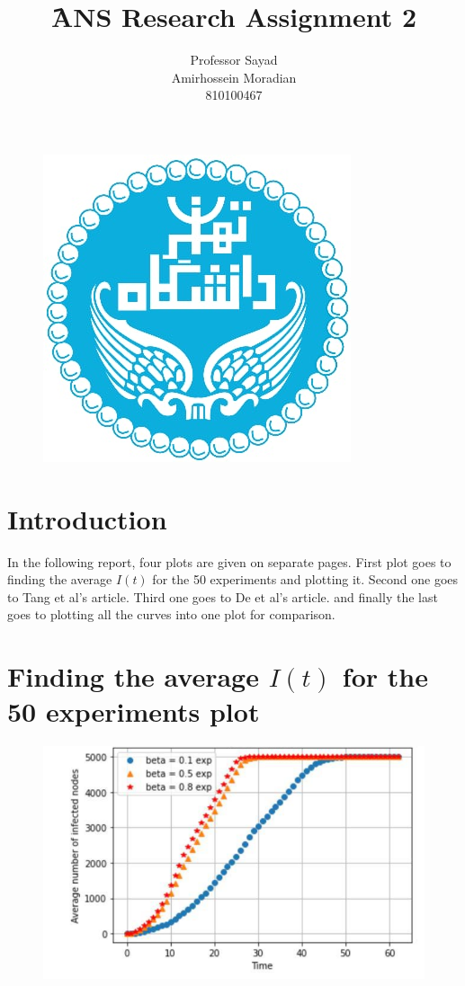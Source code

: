 \documentclass[a4paper]{article}
\title{َ\textbf{ANS Research Assignment 2}}
\author{ Professor Sayad\\ Amirhossein Moradian\\  810100467}
\begin{document}
	
	\begin{figure}
		\centering
		\includegraphics[scale=0.75]{Figures/UT1}
	\end{figure}
	
	\maketitle
	
	\section*{Introduction}	
	In the following report, four plots are given on separate pages. First plot goes to finding the average $I(t)$ for the 50 experiments and plotting it. Second one goes to Tang et al's article. Third one goes to De et al's article. and finally the last goes to plotting all the curves into one plot for comparison.
	\pagebreak
	
	\section{Finding the average $I(t)$ for the 50 experiments plot}
	\begin{figure}[h]
		\centering
		\includegraphics[scale=0.6]{Figures/Fig1}
	\end{figure}
	\pagebreak
	
\end{document}
